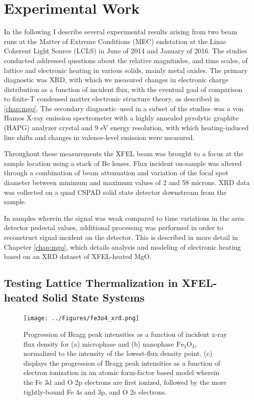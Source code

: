 \documentclass [11pt, proquest, article] {uwthesis}[2016/11/22]
\begin{document}
\section{Experimental Work}
In the following I describe several experimental results arising from two beam runs at the Matter of Extreme Conditions (MEC) endstation at the Linac Coherent Light Source (LCLS) in June of 2014 and January of 2016. The studies conducted addressed questions about the relative magnitudes, and time scales, of lattice and electronic heating in various solids, mainly metal oxides. The primary diagnostic was XRD, with which we measured changes in electronic charge distribution as a function of incident flux, with the eventual goal of comparison to finite-T condensed matter electronic structure theory, as described in \ref{chap:mgo}. The secondary diagnostic--used in a subset of the studies--was a von Hamos X-ray emission spectrometer with a highly annealed pyrolytic graphite (HAPG) analyzer crystal and 9 eV energy resolution, with which heating-induced line shifts and changes in valence-level emission were measured. 

Throughout these measurements the XFEL beam was brought to a focus at the sample location using a stack of Be lenses. Flux incident on-sample was altered through a combination of beam attenuation and variation of the focal spot diameter between minimum and maximum values of 2 and 58 microns. XRD data was collected on a quad CSPAD solid state detector downstream from the sample.\cite{herrmann2013cspad}

In samples wherein the signal was weak compared to time variations in the area detector pedestal values, additional processing was performed in order to reconstruct signal incident on the detector. 
This is described in more detail in Chapeter \ref{chap:mgo}, which details analysis and modeling of electronic heating based on an XRD dataset of XFEL-heated MgO.
 
\subsection{Testing Lattice Thermalization in XFEL-heated Solid State Systems}

\begin{figure}[h] 
\caption{Progression of Bragg peak intensities as a function of incident x-ray flux density for (a) microphase and (b) nanophase $\mathrm{Fe}_3\mathrm{O}_4$, normalized to the intensity of the lowest-flux density point. (c) displays the progression of Bragg peak intensities as a function of electron ionization in an atomic form-factor based model wherein the Fe 3d and O 2p electrons are first ionized, followed by the more tightly-bound Fe 4s and 3p, and O 2s electrons. \cite{mortfe3o4}}
\label{fexrd}
\centering
\texttt{[image: ../Figures/fe3o4\_xrd.png]}
\end{figure}
\end{document}

